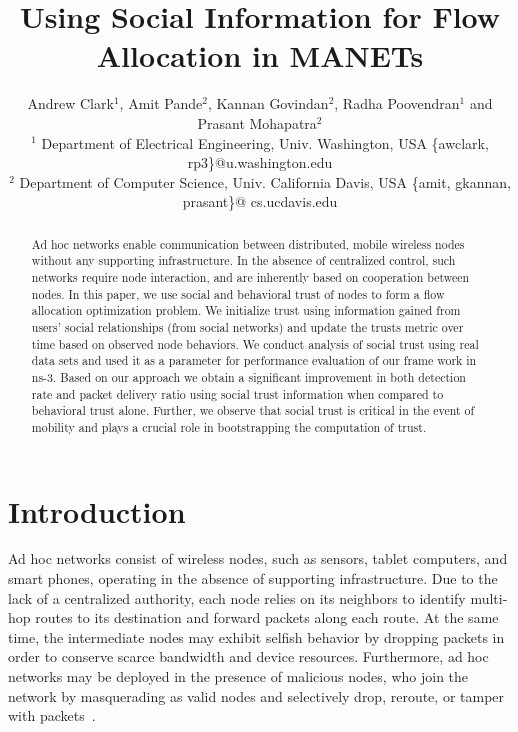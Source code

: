 \documentclass[conference]{IEEEtran}
\begin{document}
\title{ Using Social Information for Flow Allocation in MANETs}
\author{
Andrew Clark$^1$, Amit Pande$^2$, Kannan Govindan$^2$,
Radha Poovendran$^1$ and Prasant Mohapatra$^2$\\
$^1$ Department of Electrical Engineering, Univ. Washington, USA \{awclark, rp3\}@u.washington.edu\\
$^2$ Department of Computer Science, Univ. California Davis, USA \{amit, gkannan, prasant\}@ cs.ucdavis.edu\\

}


\maketitle
\begin{abstract}
Ad hoc networks enable communication between distributed, mobile wireless nodes without any supporting infrastructure. In the absence of centralized control, such networks require node interaction, and are inherently based on cooperation between nodes. In this paper, we use social and behavioral trust of nodes to form a flow allocation optimization problem.
We initialize trust using information gained from users' social relationships (from social networks) and update the trusts metric over time based on observed node behaviors. We conduct analysis of social trust  using real data sets and used it as a parameter for performance evaluation of our frame work in ns-3. Based on our approach we obtain a significant improvement in both detection rate and packet delivery ratio using social trust information when compared to behavioral trust alone. Further, we observe that social trust is critical in the event of mobility and plays a crucial role in bootstrapping the computation of trust.
\end{abstract}

\section{Introduction}
\label{sec:intro}
Ad hoc networks  consist of wireless nodes, such as sensors, tablet computers, and smart phones, operating in the absence of supporting infrastructure.
 Due to the lack of a centralized authority, each node relies on its neighbors to identify multi-hop routes to its destination and forward packets along each route.
 At the same time, the intermediate nodes may exhibit selfish behavior by dropping packets in order to conserve scarce bandwidth and device resources.
	Furthermore, ad hoc networks may be deployed in the presence of malicious nodes, who join the network by masquerading as valid nodes and selectively drop, reroute, or tamper with packets~\cite{karlof2003secure}.
\end{document}
